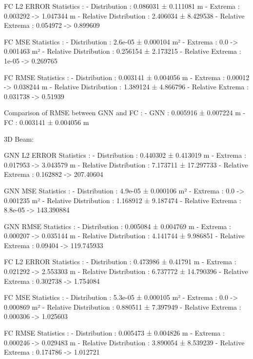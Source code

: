 \documentclass{beamer}
\begin{document}
FC L2 ERROR Statistics :
        - Distribution : 0.086031 ± 0.111081 m
        - Extrema : 0.003292 -> 1.047344 m
        - Relative Distribution : 2.406034 ± 8.429538 %
        - Relative Extrema : 0.054972 -> 0.899609 %

FC MSE Statistics :
        - Distribution : 2.6e-05 ± 0.000104 m²
        - Extrema : 0.0 -> 0.001463 m²
        - Relative Distribution : 0.256154 ± 2.173215 %
        - Relative Extrema : 1e-05 -> 0.269765 %

FC RMSE Statistics :
        - Distribution : 0.003141 ± 0.004056 m
        - Extrema : 0.00012 -> 0.038244 m
        - Relative Distribution : 1.389124 ± 4.866796 %
        - Relative Extrema : 0.031738 -> 0.51939 %

Comparison of RMSE between GNN and FC :
        - GNN : 0.005916 ± 0.007224 m
        - FC : 0.003141 ± 0.004056 m

\fi


\iffalse
3D Beam:

GNN L2 ERROR Statistics :
        - Distribution : 0.440302 ± 0.413019 m
        - Extrema : 0.017953 -> 3.043579 m
        - Relative Distribution : 7.173711 ± 17.297733 %
        - Relative Extrema : 0.162882 -> 207.40604 %

GNN MSE Statistics :
        - Distribution : 4.9e-05 ± 0.000106 m²
        - Extrema : 0.0 -> 0.001235 m²
        - Relative Distribution : 1.168912 ± 9.187474 %
        - Relative Extrema : 8.8e-05 -> 143.390884 %

GNN RMSE Statistics :
        - Distribution : 0.005084 ± 0.004769 m
        - Extrema : 0.000207 -> 0.035144 m
        - Relative Distribution : 4.141744 ± 9.986851 %
        - Relative Extrema : 0.09404 -> 119.745933 %

FC L2 ERROR Statistics :
        - Distribution : 0.473986 ± 0.41791 m
        - Extrema : 0.021292 -> 2.553303 m
        - Relative Distribution : 6.737772 ± 14.790396 %
        - Relative Extrema : 0.302738 -> 1.754084 %

FC MSE Statistics :
        - Distribution : 5.3e-05 ± 0.000105 m²
        - Extrema : 0.0 -> 0.000869 m²
        - Relative Distribution : 0.880511 ± 7.397949 %
        - Relative Extrema : 0.000306 -> 1.025603 %

FC RMSE Statistics :
        - Distribution : 0.005473 ± 0.004826 m
        - Extrema : 0.000246 -> 0.029483 m
        - Relative Distribution : 3.890054 ± 8.539239 %
        - Relative Extrema : 0.174786 -> 1.012721 %
\end{document}
